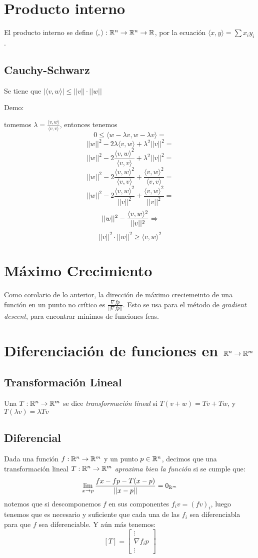\documentclass{article}
\begin{document}
\section*{Producto interno}
El producto interno se define $\langle , \rangle : \mathbb{R}^n \to \mathbb{R}^n \to \mathbb{R}$, por la ecuación $\langle x, y \rangle = \sum x_iy_i$.

\subsection*{Cauchy-Schwarz}
Se tiene que $|\langle v, w \rangle| \leq ||v|| \cdot ||w||$

Demo:

tomemos $\lambda = \frac{\langle v, w \rangle}{\langle v, v \rangle}$, entonces tenemos
\[0 \leq \langle w - \lambda v, w - \lambda v \rangle =\]
\[||w||^2 - 2\lambda\langle v, w\rangle + \lambda^2 ||v||^2 =\]
\[||w||^2 - 2\frac{\langle v, w\rangle^2}{\langle v, v \rangle} + \lambda^2 ||v||^2 =\]
\[||w||^2 - 2\frac{\langle v, w\rangle^2}{\langle v, v \rangle} + \frac{\langle v, w\rangle^2}{\langle v, v \rangle} =\]
\[||w||^2 - 2\frac{\langle v, w\rangle^2}{||v||^2} + \frac{\langle v, w\rangle^2}{||v||^2} =\]
\[||w||^2 - \frac{\langle v, w\rangle^2}{||v||^2} \Rightarrow\]
\[||v||^2 \cdot||w||^2 \geq \langle v, w\rangle^2\]

\section*{Máximo Crecimiento}
Como corolario de lo anterior, la dirección de máximo creciemeinto de una función en un punto no crítico es $\frac{\nabla f p}{||\nabla f p||} $. Esto se usa para el método de \emph{gradient descent}, para encontrar mínimos de funciones feas.

\section*{Diferenciación de funciones en $\mathbb{R}^n \to \mathbb{R}^m$}
\subsection*{Transformación Lineal}
Una $T : \mathbb{R}^n \to \mathbb{R}^m$ se dice \emph{transformación lineal} si $T (v+w) = Tv + Tw$, y $T (\lambda v) = \lambda Tv$

\subsection*{Diferencial}
Dada una función $f : \mathbb{R}^n \to \mathbb{R}^m$ y un punto $p \in \mathbb{R}^n$, decimos que una transformación lineal $T : \mathbb{R}^n \to \mathbb{R}^m$ \emph{aproxima bien la función} si se cumple que:
\[
	\lim_{x \to p}\frac{fx - fp - T(x-p)}{||x-p||} = 0_{\mathbb{R}^m}
\]
notemos que si descomponemos $f$ en sus componentes $f_iv = (fv)_i$, luego tenemos que es necesario y suficiente que cada una de las $f_i$ sea diferenciabla para que $f$ sea diferenciable. Y aún más tenemos:
\[[T] =
\begin{bmatrix}
	\vdots \\
	\nabla f_i p \\
	\vdots 
\end{bmatrix}
\]
\end{document}
